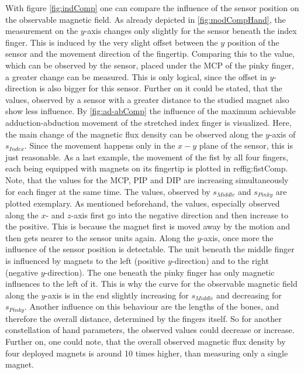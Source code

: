 With figure \ref{fig:indComp} one can compare the influence of the sensor position on the observable magnetic field. As already depicted in \ref{fig:modCompHand}, the measurement on the $ y $-axis changes only slightly for the sensor beneath the index finger. This is induced by the very slight offset between the $ y $ position of the sensor and the movement direction of the fingertip. Comparing this to the value, which can be observed by the sensor, placed under the \ac{MCP} of the pinky finger, a greater change can be measured. This is only logical, since the offset in $ y $-direction is also bigger for this sensor. Further on it could be stated, that the values, observed by a sensor with a greater distance to the studied magnet also show less influence. By \ref{fig:ad-abComp} the influence of the maximum achievable adduction-abduction movement of the stretched index finger is visualized. Here, the main change of the magnetic flux density can be observed along the $ y $-axis of $ s_{Index} $. Since the movement happens only in the $ x-y $ plane of the sensor, this is just reasonable. As a last example, the movement of the fist by all four fingers, each being equipped with magnets on its fingertip is plotted in ref{fig:fistComp}. Note, that the values for the \ac{MCP}, \ac{PIP} and \ac{DIP} are increasing simultaneously for each finger at the same time. The values, observed by $ s_{Middle} $ and $ s_{Pinky} $ are plotted exemplary. As mentioned beforehand, the values, especially observed along the $ x $- and $ z $-axis first go into the negative direction and then increase to the positive. This is because the magnet first is moved \grqq away \grqq by the motion and then gets nearer to the sensor units again. Along the $ y $-axis, once more the influence of the sensor position is detectable. The unit beneath the middle finger is influenced by magnets to the left (positive $ y $-direction) and to the right (negative $ y $-direction). The one beneath the pinky finger has only magnetic influences to the left of it. This is why the curve for the observable magnetic field along the $ y $-axis is in the end slightly increasing for $ s_{Middle} $ and decreasing for $ s_{Pinky} $. Another influence on this behaviour are the lengths of the bones, and therefore the overall distance, determined by the fingers itself. So for another constellation of hand parameters, the observed values could decrease or increase. Further on, one could note, that the overall observed magnetic flux density by four deployed magnets is around 10 times higher, than measuring only a single magnet.\\
